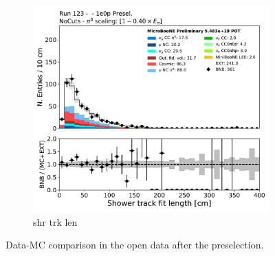 \begin{figure}[H] 
\begin{center}
    \begin{subfigure}[b]{0.3\textwidth}
    \centering
    \includegraphics[width=1.00\textwidth]{1e0p/dataMCRun123/shr_trk_len.pdf}
    \caption{\label{fig:1e0p:dataMCRun1:shr_start_y} shr trk len }
    \end{subfigure}
\caption{\label{fig:1e0p:dataMCRun1:shrlen}Data-MC comparison in the open data after the \zpsel preselection.}
\end{center}
\end{figure}